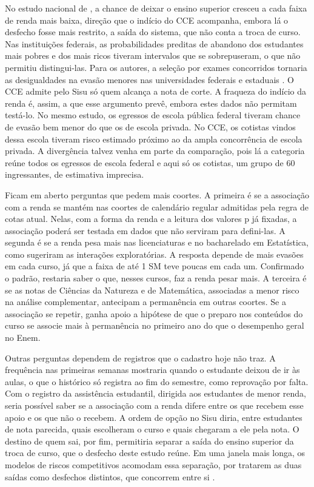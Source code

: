 \documentclass[12pt,a4paper]{article}
\begin{document}
No estudo nacional de \citet{paulaDESIGUALDADESAPOSACESSO2024}, a chance de deixar o ensino superior cresceu a cada faixa de renda mais baixa, direção que o indício do CCE acompanha, embora lá o desfecho fosse mais restrito, a saída do sistema, que não conta a troca de curso. Nas instituições federais, as probabilidades preditas de abandono dos estudantes mais pobres e dos mais ricos tiveram intervalos que se sobrepuseram, o que não permitiu distingui-las. Para os autores, a seleção por exames concorridos tornaria as desigualdades na evasão menores nas universidades federais e estaduais \citep[p.~14]{paulaDESIGUALDADESAPOSACESSO2024}. O CCE admite pelo Sisu só quem alcança a nota de corte. A fraqueza do indício da renda é, assim, a que esse argumento prevê, embora estes dados não permitam testá-lo. No mesmo estudo, os egressos de escola pública federal tiveram chance de evasão bem menor do que os de escola privada. No CCE, os cotistas vindos dessa escola tiveram risco estimado próximo ao da ampla concorrência de escola privada. A divergência talvez venha em parte da comparação, pois lá a categoria reúne todos os egressos de escola federal e aqui só os cotistas, um grupo de 60 ingressantes, de estimativa imprecisa.

Ficam em aberto perguntas que pedem mais coortes. A primeira é se a associação com a renda se mantém nas coortes de calendário regular admitidas pela regra de cotas atual. Nelas, com a forma da renda e a leitura dos valores p já fixadas, a associação poderá ser testada em dados que não serviram para defini-las. A segunda é se a renda pesa mais nas licenciaturas e no bacharelado em Estatística, como sugeriram as interações exploratórias. A resposta depende de mais evasões em cada curso, já que a faixa de até 1 SM teve poucas em cada um. Confirmado o padrão, restaria saber o que, nesses cursos, faz a renda pesar mais. A terceira é se as notas de Ciências da Natureza e de Matemática, associadas a menor risco na análise complementar, antecipam a permanência em outras coortes. Se a associação se repetir, ganha apoio a hipótese de que o preparo nos conteúdos do curso se associe mais à permanência no primeiro ano do que o desempenho geral no Enem.

Outras perguntas dependem de registros que o cadastro hoje não traz. A frequência nas primeiras semanas mostraria quando o estudante deixou de ir às aulas, o que o histórico só registra ao fim do semestre, como reprovação por falta. Com o registro da assistência estudantil, dirigida aos estudantes de menor renda, seria possível saber se a associação com a renda difere entre os que recebem esse apoio e os que não o recebem. A ordem de opção no Sisu diria, entre estudantes de nota parecida, quais escolheram o curso e quais chegaram a ele pela nota. O destino de quem sai, por fim, permitiria separar a saída do ensino superior da troca de curso, que o desfecho deste estudo reúne. Em uma janela mais longa, os modelos de riscos competitivos acomodam essa separação, por tratarem as duas saídas como desfechos distintos, que concorrem entre si \citep{gomesDeterminantesEvasaoNo2024}.
\end{document}
